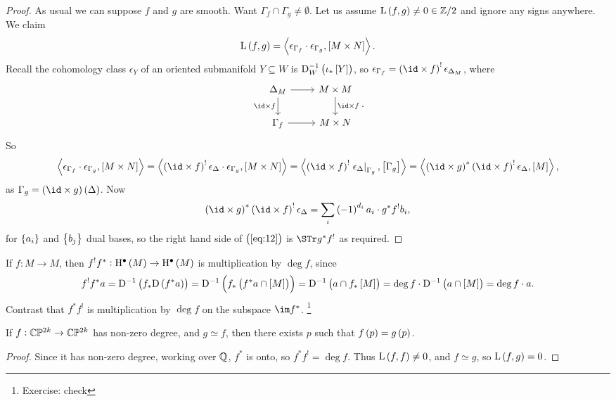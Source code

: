 \begin{proof}
As usual we can suppose $ f $ and $ g $ are smooth. Want $ \Gamma_f \cap \Gamma_g \ne \emptyset $. Let us assume $ \L\br{f, g} \ne 0 \in \ZZ / 2 $ and ignore any signs anywhere. We claim
\begin{equation}
\label{eq:12}
\L\br{f, g} = \abr{\epsilon_{\Gamma_f} \cdot \epsilon_{\Gamma_g}, \sbr{M \times N}}.
\end{equation}
Recall the cohomology class $ \epsilon_Y $ of an oriented submanifold $ Y \subseteq W $ is $ \D_W^{-1}\br{\iota_*\sbr{Y}} $, so $ \epsilon_{\Gamma_f} = \br{\id \times f}^!\epsilon_{\Delta_M} $, where
$$
\begin{tikzcd}
\Delta_M \arrow{r} \arrow{d}[swap]{\id \times f} & M \times M \arrow{d}{\id \times f} \\
\Gamma_f \arrow{r} & M \times N
\end{tikzcd}.
$$
So
$$ \abr{\epsilon_{\Gamma_f} \cdot \epsilon_{\Gamma_g}, \sbr{M \times N}} = \abr{\br{\id \times f}^!\epsilon_\Delta \cdot \epsilon_{\Gamma_g}, \sbr{M \times N}} = \abr{\br{\id \times f}^!\eval{\epsilon_\Delta}_{\Gamma_g}, \sbr{\Gamma_g}} = \abr{\br{\id \times g}^*\br{\id \times f}^!\epsilon_\Delta, \sbr{M}}, $$
as $ \Gamma_g = \br{\id \times g}\br{\Delta} $. Now
$$ \br{\id \times g}^*\br{\id \times f}^!\epsilon_\Delta = \sum_i \br{-1}^{d_i}a_i \cdot g^*f^!b_i, $$
for $ \cbr{a_i} $ and $ \cbr{b_j} $ dual bases, so the right hand side of $ \br{\ref{eq:12}} $ is $ \STr g^*f^! $ as required.
\end{proof}

\begin{example*}
If $ f : M \to M $, then $ f^!f^* : \H^\bullet\br{M} \to \H^\bullet\br{M} $ is multiplication by $ \deg f $, since
$$ f^!f^*a = \D^{-1}\br{f_*\D\br{f^*a}} = \D^{-1}\br{f_*\br{f^*a \cap \sbr{M}}} = \D^{-1}\br{a \cap f_*\sbr{M}} = \deg f \cdot \D^{-1}\br{a \cap \sbr{M}} = \deg f \cdot a. $$
Contrast that $ f^*f^! $ is multiplication by $ \deg f $ on the subspace $ \im f^* $. \footnote{Exercise: check}
\end{example*}

\begin{corollary}
If $ f : \mathbb{C}\mathbb{P}^{2k} \to \mathbb{C}\mathbb{P}^{2k} $ has non-zero degree, and $ g \simeq f $, then there exists $ p $ such that $ f\br{p} = g\br{p} $.
\end{corollary}

\begin{proof}
Since it has non-zero degree, working over $ \mathbb{Q} $, $ f^* $ is onto, so $ f^*f^! = \deg f $. Thus $ \L\br{f, f} \ne 0 $, and $ f \simeq g $, so $ \L\br{f, g} = 0 $.
\end{proof}

